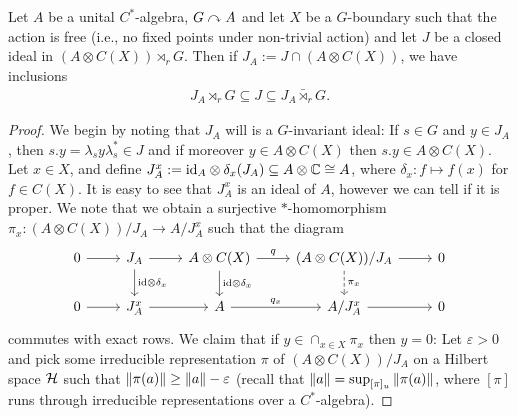 \begin{proposition}
	Let $A$ be a unital $C^*$-algebra, $G \stackrel{}{\curvearrowright} {A}$ and let $X$ be a $G$-boundary such that the action is free (i.e., no fixed points under non-trivial action) and let $J$ be a closed ideal in $(A \otimes C(X)) \rtimes_r G$. Then if $J_A := J \cap (A \otimes C(X))$, we have inclusions
	\begin{align*}
		 J_A \rtimes_r G \subseteq J \subseteq J_A \bar \rtimes_r G.
	\end{align*}
	\label{ozawprop18}
\end{proposition}
\begin{proof}
	We begin by noting that $J_A$ will is a $G$-invariant ideal: If $s \in G$ and $y \in J_A$, then $s.y = \lambda_s y \lambda_s^*  \in J$ and if moreover $y \in A \otimes C(X)$ then $s.y \in A \otimes C(X)$. Let $x \in X$, and define $J_A^x := \mathrm{id}_A \otimes \delta_x(J_A) \subseteq A \otimes \mathbb{C} \cong A$, where $\delta_x \colon f \mapsto f(x)$ for $f \in C(X)$. It is easy to see that $J_A^x$ is an ideal of $A$, however we can tell if it is proper. We note that we obtain a surjective $*$-homomorphism $\pi_x \colon (A \otimes C(X)) / J_A \to A / J_A^x$ such that the diagram
	\begin{equation*}
		\begin{tikzcd}
			0 \ar[r] & J_A \ar[r] \ar[d, "\mathrm{id}\otimes \delta_x"] & A \otimes C(X) \ar[d, "\mathrm{id}\otimes \delta_x"] \ar[r,"q"] &(A \otimes C(X)) /J_A \ar[r] \ar[d,dashed, "\pi_x"] & 0\\
			0 \ar[r] & J_A^x \ar[r] & A \ar[r, "q_x"] & A/J_A^x \ar[r] & 0
		\end{tikzcd}
	\end{equation*}
	commutes with exact rows. We claim that if $y \in \cap_{x \in X} \pi_x$ then $y = 0$: Let $\varepsilon > 0$ and pick some irreducible representation $\pi$ of $(A \otimes C(X))/J_A$ on a Hilbert space $\mathcal{H}$ such that $\left\lVert \pi(a) \right\rVert \geq \left\lVert a \right\rVert - \varepsilon$ (recall that $\left\lVert a \right\rVert = \sup_{[\pi]_u} \left\lVert \pi(a)\right\rVert$, where $[\pi]$ runs through irreducible representations over a $C^*$-algebra).
	

\end{proof}

